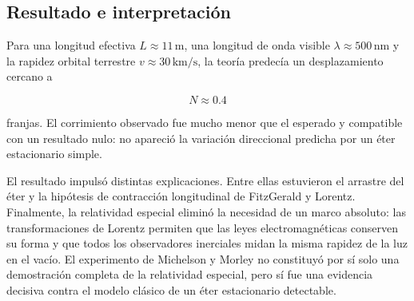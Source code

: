 \subsection{Resultado e interpretación}

Para una longitud efectiva $L\approx 11\,\mathrm{m}$, una longitud de onda visible $\lambda\approx 500\,\mathrm{nm}$ y la rapidez orbital terrestre $v\approx 30\,\mathrm{km/s}$, la teoría predecía un desplazamiento cercano a

\[
    N\approx 0.4
\]

franjas. El corrimiento observado fue mucho menor que el esperado y compatible con un resultado nulo: no apareció la variación direccional predicha por un éter estacionario simple.

El resultado impulsó distintas explicaciones. Entre ellas estuvieron el arrastre del éter y la hipótesis de contracción longitudinal de FitzGerald y Lorentz. Finalmente, la relatividad especial eliminó la necesidad de un marco absoluto: las transformaciones de Lorentz permiten que las leyes electromagnéticas conserven su forma y que todos los observadores inerciales midan la misma rapidez de la luz en el vacío. El experimento de Michelson y Morley no constituyó por sí solo una demostración completa de la relatividad especial, pero sí fue una evidencia decisiva contra el modelo clásico de un éter estacionario detectable.